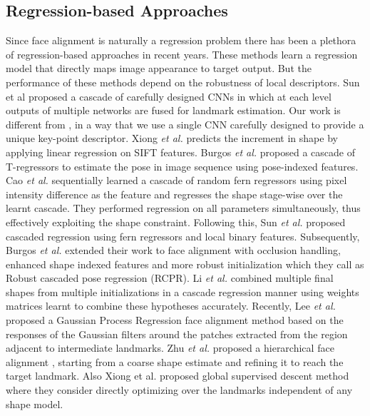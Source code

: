 \documentclass[10pt,twocolumn,letterpaper]{article}
\begin{document}
\subsection{Regression-based Approaches}
Since face alignment is naturally a regression problem there has been a plethora of regression-based approaches in recent years. These methods learn a regression model that directly maps image appearance to target output. But the performance of these methods depend on the robustness of local descriptors. Sun et al \cite{Sun:2013:DCN:2514950.2516090} proposed a cascade of carefully designed CNNs in which at each level outputs of multiple networks are fused for landmark estimation. Our work is different from \cite{Sun:2013:DCN:2514950.2516090}, in a way that we use a single CNN carefully designed to provide a unique key-point descriptor. Xiong \textit{et al.} \cite{XiongD13} predicts the increment in shape by applying linear regression on SIFT features. Burgos \textit{et al.}\cite{Welinder10p.:cascaded} proposed a cascade of T-regressors to estimate the pose in image sequence using pose-indexed features. Cao \textit{et al.} \cite{DBLP:journals/ijcv/CaoWWS14} sequentially learned a cascade of random fern regressors using pixel intensity difference as the feature and regresses the shape stage-wise over the learnt cascade. They performed regression on all parameters simultaneously, thus effectively exploiting the shape constraint. Following this, Sun \textit{et al.} \cite{DBLP:conf/cvpr/RenCW014} proposed cascaded regression using fern regressors and local binary features. Subsequently, Burgos \textit{et al.} \cite{10.1109/ICCV.2013.191} extended their work to face alignment with occlusion handling, enhanced shape indexed features and more robust initialization which they call as Robust cascaded pose regression (RCPR). Li \textit{et al.} \cite{Yan:2013:LCM:2586110.2586274} combined multiple final shapes from multiple initializations in a cascade regression manner using weights matrices learnt to combine these hypotheses accurately. Recently, Lee \textit{et al.} \cite{Lee_2015_CVPR} proposed a Gaussian Process Regression face alignment method based on the responses of the Gaussian filters around the patches extracted from the region adjacent to intermediate landmarks. Zhu \textit{et al.} \cite{Zhu_2015_CVPR} proposed a hierarchical face alignment , starting from a coarse shape estimate and refining it to reach the target landmark. Also Xiong {et al.} \cite{global2015xiong} proposed global supervised descent method where they consider directly optimizing over the landmarks independent of any shape model.   
\end{document}
